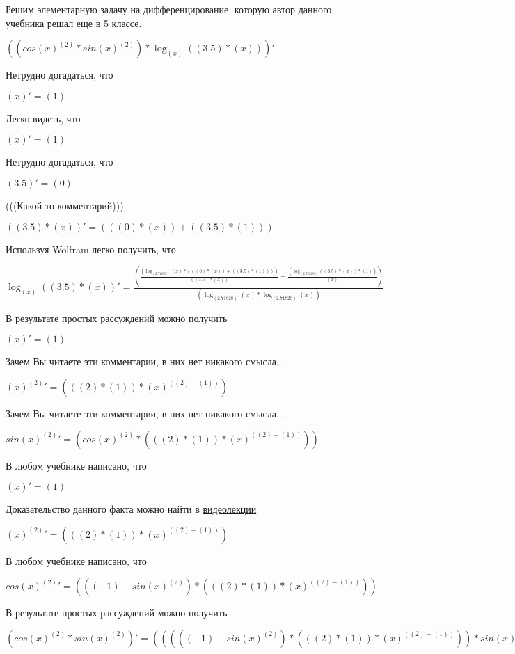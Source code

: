 \documentclass[12pt,a4paper,fleqn]{article}
\theoremstyle{definition}
\begin{document}
Решим элементарную задачу на дифференцирование, которую автор данного учебника решал еще в 5 классе.


$((cos{( x )}^{( 2 )} * sin{( x )}^{( 2 )}) * \log_{( x )}{(( 3.5 ) * ( x ))})'$

Нетрудно догадаться, что

$( x )' = ( 1 )$

Легко видеть, что

$( x )' = ( 1 )$

Нетрудно догадаться, что

$( 3.5 )' = ( 0 )$

(((Какой-то комментарий)))

$(( 3.5 ) * ( x ))' = ((( 0 ) * ( x )) + (( 3.5 ) * ( 1 )))$

Используя Wolfram легко получить, что

$\log_{( x )}{(( 3.5 ) * ( x ))}' = \frac{(\frac{(\log_{( 2.71828 )}{( x )} * ((( 0 ) * ( x )) + (( 3.5 ) * ( 1 ))))}{(( 3.5 ) * ( x ))}
 - \frac{(\log_{( 2.71828 )}{(( 3.5 ) * ( x ))} * ( 1 ))}{( x )}
)}{(\log_{( 2.71828 )}{( x )} * \log_{( 2.71828 )}{( x )})}
$

В результате простых рассуждений можно получить

$( x )' = ( 1 )$

Зачем Вы читаете эти комментарии, в них нет никакого смысла...

${( x )}^{( 2 )}' = ((( 2 ) * ( 1 )) * {( x )}^{(( 2 ) - ( 1 ))})$

Зачем Вы читаете эти комментарии, в них нет никакого смысла...

$sin{( x )}^{( 2 )}' = (cos{( x )}^{( 2 )} * ((( 2 ) * ( 1 )) * {( x )}^{(( 2 ) - ( 1 ))}))$

В любом учебнике написано, что

$( x )' = ( 1 )$

Доказательство данного факта можно найти в \href{https://www.youtube.com/watch?v=dQw4w9WgXcQ}{видеолекции}

${( x )}^{( 2 )}' = ((( 2 ) * ( 1 )) * {( x )}^{(( 2 ) - ( 1 ))})$

В любом учебнике написано, что

$cos{( x )}^{( 2 )}' = ((( -1 ) - sin{( x )}^{( 2 )}) * ((( 2 ) * ( 1 )) * {( x )}^{(( 2 ) - ( 1 ))}))$

В результате простых рассуждений можно получить

$(cos{( x )}^{( 2 )} * sin{( x )}^{( 2 )})' = ((((( -1 ) - sin{( x )}^{( 2 )}) * ((( 2 ) * ( 1 )) * {( x )}^{(( 2 ) - ( 1 ))})) * sin{( x )}^{( 2 )}) + (cos{( x )}^{( 2 )} * (cos{( x )}^{( 2 )} * ((( 2 ) * ( 1 )) * {( x )}^{(( 2 ) - ( 1 ))}))))$
\end{document}
